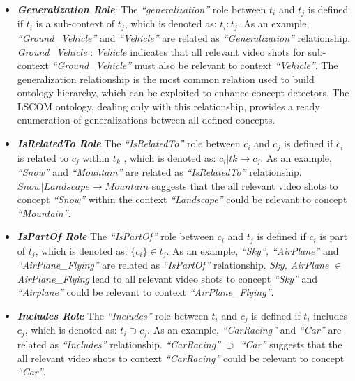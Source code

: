 						\begin{itemize}
							\item \textit{\textbf{Generalization Role}}: The \textit{``generalization''} 
							role between $t_{i}$ and $t_{j}$ is defined if $t_{i}$ 
							is a sub-context of $t_{j}$, 
							which is denoted as: $t_{i}:t_{j} $.  As an example, \textit{“Ground\_Vehicle”}
							and \textit{“Vehicle”} are related as \textit{“Generalization”} relationship.
							\textit{Ground\_Vehicle} : \textit{Vehicle} indicates that all relevant video
							shots for sub-context \textit{“Ground\_Vehicle”} must also be relevant to context
							\textit{“Vehicle”}. The generalization relationship is the most common relation
							used to build ontology hierarchy, which can be exploited to enhance concept
							detectors. The LSCOM  ontology, dealing only with this relationship, 
							provides a ready enumeration of generalizations between all defined concepts. 
			
							\item \textit{\textbf{IsRelatedTo Role}} The \textit{“IsRelatedTo”} 
							role between $c_{i}$ and $c_{j}$ is defined if $c_{i}$ is related
							to $c_{j}$ within $t_{k}$ , which is denoted as: $c_{i} |t{k}\rightarrow 
							c_{j}$. As an example, \textit{ “Snow”} and \textit{“Mountain”} are 
							related  as \textit{“IsRelatedTo”} relationship. $Snow |Landscape 
							\rightarrow Mountain$ suggests that the all relevant video shots 
							to concept \textit{“Snow”} within the context \textit{“Landscape”} 
							could be relevant to concept \textit{“Mountain”}. 
		 
							\item \textit{\textbf{IsPartOf Role}} The \textit{“IsPartOf”} role between
							$c_{i}$ and $t_{j}$ is defined if $c_{i}$  is part of $t_{j}$, 
							which is denoted as:  $\{c_{i}\} \in t_{j}$. As an example, 
							{\textit{“Sky”, “AirPlane”}} and \textit{“AirPlane\_Flying”} are related 
							as \textit{“IsPartOf”} relationship. \textit{Sky, AirPlane $\in$  
							AirPlane\_Flying} lead to all relevant video shots to concept 
							\textit{“Sky”} and \textit{“Airplane”} could be relevant to 
							context \textit{“AirPlane\_Flying”}. 

							\item \textit{\textbf{Includes Role}} The \textit{“Includes”} role 
							between $t_{i}$ and $c_{j}$ is defined if $t_{i}$ includes $c_{j}$, 
							which is denoted as: $t_{i} \supset c_{j}$. As an example, 
							\textit{“CarRacing”} and \textit{“Car”} are related as 
							\textit{“Includes”} relationship. \textit{“CarRacing” 
							$\supset$ “Car”} suggests that the all relevant video shots 
							to context\textit{ “CarRacing”} could be relevant to concept \textit{“Car”}. 
						\end{itemize}

